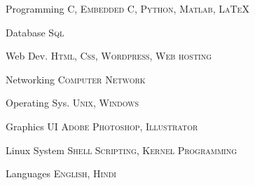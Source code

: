 \vspace{-10pt}

\begin{cvskills}


\cvskill
{Programming} %
{\textsc{C}, \textsc{Embedded C}, \textsc{Python}, \textsc{Matlab}, \textsc{\LaTeX}} %


\cvskill
{Database} %
{\textsc{Sql}} %


\cvskill
{Web Dev.} %
{\textsc{Html}, \textsc{Css}, \textsc{Wordpress}, \textsc{Web hosting}} %


\cvskill
{Networking} %
{\textsc{Computer Network}} %


\cvskill
{Operating Sys.} %
{\textsc{Unix}, \textsc{Windows}} %


\cvskill
{Graphics UI} %
{\textsc{Adobe Photoshop}, \textsc{Illustrator}} %


\cvskill
{Linux System}%
{\textsc{Shell Scripting}, \textsc{Kernel Programming}} %


\cvskill
{Languages} %
{\textsc{English}, \textsc{Hindi}} %

\end{cvskills}